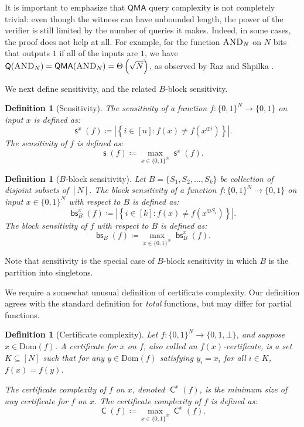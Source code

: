\documentclass[10pt,a4paper]{article}
\newtheorem{definition}[theorem]{Definition}
\newcommand{\AND}{\normalfont\textsc{AND}} %
\newcommand{\Dom}{\mathrm{Dom}}
\DeclareMathOperator{\C}{\mathsf{C}}
\DeclareMathOperator{\Q}{\mathsf{Q}}
\DeclareMathOperator{\s}{\mathsf{s}}
\DeclareMathOperator{\bs}{\mathsf{bs}}
\DeclareMathOperator{\QMA}{\mathsf{QMA}}
\begin{document}
It is important to emphasize that $\mathsf{QMA}$ query complexity is not completely trivial: even though the witness can have unbounded length, the power of the verifier is still limited by the number of queries it makes. Indeed, in some cases, the proof does not help at all. For example, for the function $\AND_N$ on $N$ bits that outputs $1$ if all of the inputs are $1$, we have $\Q(\AND_N) = \QMA(\AND_N) = \Theta\left(\sqrt{N}\right)$, as observed by Raz and Shpilka \cite{RS04}.

We next define sensitivity, and the related $B$-block sensitivity.

\begin{definition}[Sensitivity]
The \emph{sensitivity} of a function $f: \{0,1\}^N \to \{0,1\}$ on input $x$ is defined as:
\[
\s^x(f) \coloneqq \left|\left\{i \in [n] : f(x) \neq f\left(x^{\oplus i}\right)\right\}\right|.
\]
The \emph{sensitivity of $f$} is defined as:
\[
\s(f) \coloneqq \max_{x \in \{0,1\}^N} \s^x(f).
\]
\end{definition}

\begin{definition}[$B$-block sensitivity]
\label{def:d_block_sensitivity}
Let $B = \{S_1,S_2,\ldots,S_k\}$ be collection of disjoint subsets of $[N]$. The \emph{block sensitivity} of a function $f: \{0,1\}^N \to \{0,1\}$ on input $x \in \{0,1\}^N$ with respect to $B$ is defined as:
\[
\bs_B^x(f) \coloneqq \left|\left\{i \in [k] : f(x) \neq f\left(x^{\oplus S_i}\right)\right\}\right|.
\]
The \emph{block sensitivity of $f$} with respect to $B$ is defined as:
\[
\bs_B(f) \coloneqq \max_{x \in \{0,1\}^N} \bs_B^x(f).
\]
\end{definition}

Note that sensitivity is the special case of $B$-block sensitivity in which $B$ is the partition into singletons.

We require a somewhat unusual definition of certificate complexity. Our definition agrees with the standard definition for \textit{total} functions, but may differ for partial functions.

\begin{definition}[Certificate complexity]
\label{def:certificate_complexity}
Let $f: \{0,1\}^N \to \{0,1,\bot\}$, and suppose $x \in \Dom(f)$. A \emph{certificate for $x$ on $f$}, also called an \emph{$f(x)$-certificate}, is a set $K \subseteq [N]$ such that for any $y \in \Dom(f)$ satisfying $y_i = x_i$ for all $i \in K$, $f(x) = f(y)$.

The \emph{certificate complexity of $f$ on $x$}, denoted $\C^x(f)$, is the minimum size of any certificate for $f$ on $x$. The \emph{certificate complexity of $f$} is defined as:
\[
\C(f) \coloneqq \max_{x \in \{0,1\}^N} \C^x(f).
\]
\end{definition}
\end{document}
